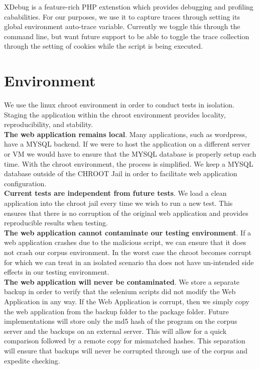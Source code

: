 \documentclass[letterpaper,twocolumn,10pt]{article}
\begin{document}
XDebug is a feature-rich PHP extenstion which provides debugging and profiling cababilities.  For our purposes, we use it to capture traces through setting its global environment auto-trace variable.  Currently we toggle this through the command line, but want future support to be able to toggle the trace collection through the setting of cookies while the script is being executed.


\section{Environment}

We use the linux chroot environment in order to conduct tests in isolation.  Staging the application within the chroot environment provides locality, reproducibility, and stability.\\

{\bf The web application remains local}.  Many applications, such as wordpress, have a MYSQL backend.  If we were to host the application on a different server or VM we would have to ensure that the MYSQL database is properly setup each time.  With the chroot environment, the process is simplified. We keep a MYSQL database outside of the CHROOT Jail in order to facilitate web application configuration.  \\

{\bf Current tests are independent from future tests}.  We load a clean application into the chroot jail every time we wish to run a new test.  This ensures that there is no corruption of the original web application and provides reproducible results when testing.\\

{\bf The web application cannot contaminate our testing environment}.  If a web application crashes due to the malicious script, we can ensure that it does not crash our corpus environment.  In the worst case the chroot becomes corrupt for which we can treat in an isolated scenario tha does not have un-intended side effects in our testing environment.  \\

{\bf The web application will never be contaminated}.  We store a separate backup in order to verify that the selenium scripts did not modify the Web Application in any way.  If the Web Application is corrupt, then we simply copy the web application from the backup folder to the package folder.  Future implementations will store only the md5 hash of the program on the corpus server and the backups on an external server.  This will allow for a quick comparison followed by a remote copy for mismatched hashes.  This separation will ensure that backups will never be corrupted through use of the corpus and expedite checking.  \\
\end{document}
